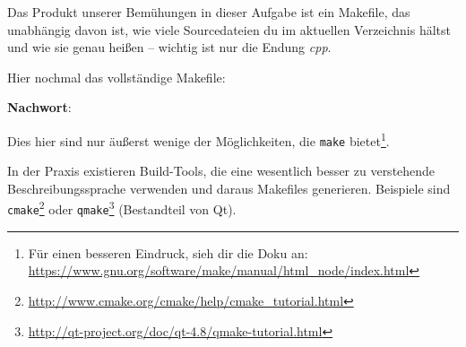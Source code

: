 
Das Produkt unserer Bemühungen in dieser Aufgabe ist ein Makefile, das unabhängig davon ist, wie viele Sourcedateien du im aktuellen Verzeichnis hältst und wie sie genau heißen -- wichtig ist nur die Endung \emph{cpp}.

Hier nochmal das vollständige Makefile:

\textbf{Nachwort}:

Dies hier sind nur äußerst wenige der Möglichkeiten, die \texttt{make} bietet\footnote{Für einen besseren Eindruck, sieh dir die Doku an: \url{https://www.gnu.org/software/make/manual/html_node/index.html}}.

In der Praxis existieren Build-Tools, die eine wesentlich besser zu verstehende Beschreibungssprache verwenden und daraus Makefiles generieren.
Beispiele sind \texttt{cmake}\footnote{\url{http://www.cmake.org/cmake/help/cmake_tutorial.html}} oder \texttt{qmake}\footnote{\url{http://qt-project.org/doc/qt-4.8/qmake-tutorial.html}} (Bestandteil von Qt).
